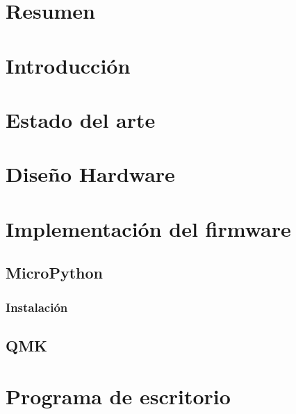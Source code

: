 


  


  \chapter*{Resumen}
    

  \tableofcontents \label{chapter:contents}

  \chapter{Introducción}
    

  \chapter{Estado del arte}
    

  \chapter{Diseño Hardware}
    

  \chapter{Implementación del firmware}
    \section{MicroPython}
      \subsection{Instalación}
        

    \section{QMK}
      

  \chapter{Programa de escritorio}
    



